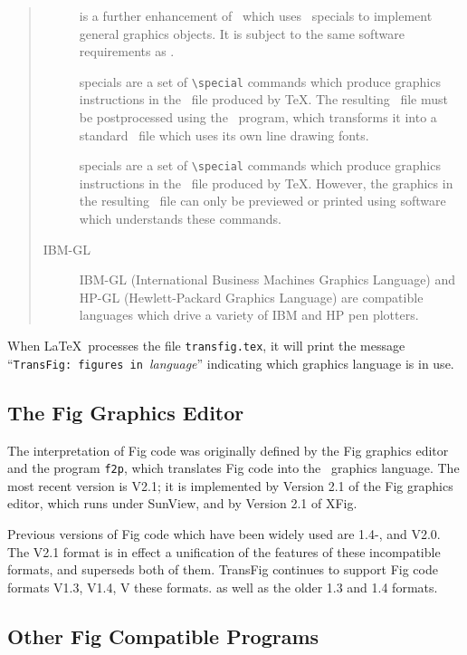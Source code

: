 \begin{quote}
\begin{description}
\item[\EEPIC]
	is a further enhancement of \EPIC\ which uses \tpic\ specials
		to implement general graphics objects.
	It is subject to the same software requirements as \tpic.

\item[\textyl]
	specials are a set of \verb|\special| commands which
		produce graphics instructions in the \DVI\ file
		produced by \TeX.
The resulting \DVI\ file must be postprocessed using the \textyl\ program,
	which transforms it into a standard \DVI\ file which uses its own
	line drawing fonts.

\item[\tpic]
	specials are a set of \verb|\special| commands which
		produce graphics instructions in the \DVI\ file
		produced by \TeX.
	However, the graphics in the resulting \DVI\ file can only be
		previewed or printed using software which understands
		these commands.

\item[IBM-GL]
	IBM-GL (International Business Machines Graphics Language) and
	HP-GL (Hewlett-Packard Graphics Language) are compatible
	languages which drive a variety of IBM and HP pen plotters.

\end{description}
\end{quote}
%
When \LaTeX\ processes the file {\tt transfig.tex}, it will print the message
	 \linebreak ``{\verb|TransFig: figures in |}{\it language}''
	indicating which graphics language is in use.

\subsection{The Fig Graphics Editor}
\label{s:fig}
The interpretation of Fig code was originally defined by
	the Fig graphics editor and the program {\tt f2p},
	which translates Fig code into the \PIC\ graphics language.
The most recent version is V2.1; it is implemented by Version 2.1 of the
	Fig graphics editor, which runs under SunView, and by Version 2.1
	of XFig.

Previous versions of Fig code which have been widely used are 1.4-\TFX,
	and V2.0.
The V2.1 format is in effect a unification of the features of these
	incompatible formats, and superseds both of them.
TransFig continues to support Fig code formats V1.3, V1.4, V
 these formats. as well as the older 1.3 and 1.4 formats.

\subsection{Other Fig Compatible Programs}
\label{s:pic2fig}


